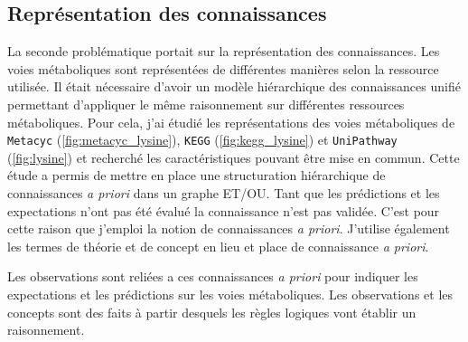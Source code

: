 \begin{refsegment}
\subsection{Représentation des connaissances}

La seconde problématique portait sur la représentation des connaissances. Les voies métaboliques sont représentées de différentes manières selon la ressource utilisée. Il était nécessaire d'avoir un modèle hiérarchique des connaissances unifié permettant d'appliquer le même raisonnement sur différentes ressources métaboliques. Pour cela, j'ai étudié les représentations des voies métaboliques de \texttt{Metacyc} (\cref{fig:metacyc_lysine}), \texttt{KEGG} (\cref{fig:kegg_lysine}) et \texttt{UniPathway} (\cref{fig:lysine}) et recherché les caractéristiques pouvant être mise en commun. Cette étude a permis de mettre en place une structuration hiérarchique de connaissances \textit{a priori} dans un graphe ET/OU. Tant que les prédictions et les expectations n'ont pas été évalué la connaissance n'est pas validée. C'est pour cette raison que j'emploi la notion de connaissances \textit{a priori}. J'utilise également les termes de théorie et de concept en lieu et place de connaissance \textit{a priori}. 

Les observations sont reliées a ces connaissances \textit{a priori} pour indiquer les expectations et les prédictions sur les voies métaboliques. Les observations et les concepts sont des faits à partir desquels les règles logiques vont établir un raisonnement. 


\end{refsegment}
